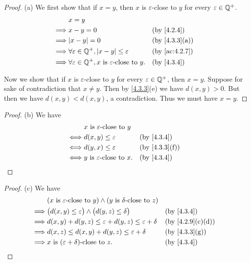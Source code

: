 \begin{proof}{(a)}
	We first show that if \(x = y\), then \(x\) is \(\varepsilon\)-close to \(y\) for every \(\varepsilon \in \mathbb{Q}^+\).
	\begin{align*}
		         & x = y                                                                                                    \\
		\implies & x - y = 0                                                               &  & \by{4.2.4}                  \\
		\implies & \abs{x - y} = 0                                                         &  & \text{(by \cref{4.3.3}(a))} \\
		\implies & \forall \varepsilon \in \Q^+, \abs{x - y} \leq \varepsilon              &  & \by{ac:4.2.7}               \\
		\implies & \forall \varepsilon \in \Q^+, x \text{ is \(\varepsilon\)-close to } y. &  & \by{4.3.4}
	\end{align*}

	Now we show that if \(x\) is \(\varepsilon\)-close to \(y\) for every \(\varepsilon \in \mathbb{Q}^+\), then \(x = y\).
	Suppose for sake of contradiction that \(x \neq y\).
	Then by \cref{4.3.3}(e) we have \(d(x, y) > 0\).
	But then we have \(d(x, y) < d(x, y)\), a contradiction.
	Thus we must have \(x = y\).
\end{proof}

\begin{proof}{(b)}
	We have
	\begin{align*}
		     & x \text{ is \(\varepsilon\)-close to } y                                   \\
		\iff & d(x, y) \leq \varepsilon                  &  & \by{4.3.4}                  \\
		\iff & d(y, x) \leq \varepsilon                  &  & \text{(by \cref{4.3.3}(f))} \\
		\iff & y \text{ is \(\varepsilon\)-close to } x. &  & \by{4.3.4}
	\end{align*}
\end{proof}

\begin{proof}{(c)}
	We have
	\begin{align*}
		         & (x \text{ is \(\varepsilon\)-close to } y) \land (y \text{ is \(\delta\)-close to } z)                                     \\
		\implies & \big(d(x, y) \leq \varepsilon\big) \land \big(d(y, z) \leq \delta\big)                 &  & \by{4.3.4}                     \\
		\implies & d(x, y) + d(y, z) \leq \varepsilon + d(y, z) \leq \varepsilon + \delta                 &  & \text{(by \cref{4.2.9}(c)(d))} \\
		\implies & d(x, z) \leq d(x, y) + d(y, z) \leq \varepsilon + \delta                               &  & \text{(by \cref{4.3.3}(g))}    \\
		\implies & x \text{ is \((\varepsilon + \delta)\)-close to } z.                                   &  & \by{4.3.4}
	\end{align*}
\end{proof}

